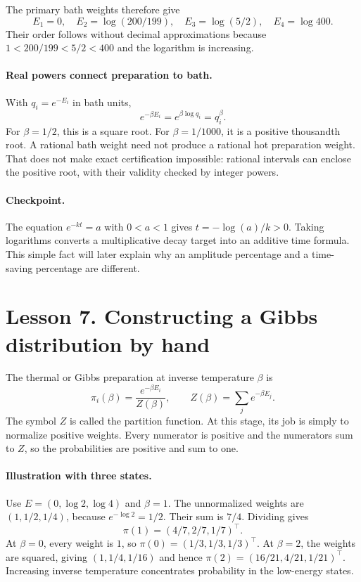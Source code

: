 The primary bath weights therefore give
\[
E_1=0,\quad E_2=\log(200/199),\quad
E_3=\log(5/2),\quad E_4=\log400.
\]
Their order follows without decimal approximations because
$1<200/199<5/2<400$ and the logarithm is increasing.

\paragraph{Real powers connect preparation to bath.}
With $q_i=e^{-E_i}$ in bath units,
\[
e^{-\beta E_i}=e^{\beta\log q_i}=q_i^\beta.
\]
For $\beta=1/2$, this is a square root. For $\beta=1/1000$, it is a positive
thousandth root. A rational bath weight need not produce a rational hot
preparation weight. That does not make exact certification impossible:
rational intervals can enclose the positive root, with their validity checked
by integer powers.

\paragraph{Checkpoint.}
The equation $e^{-kt}=a$ with $0<a<1$ gives
$t=-\log(a)/k>0$. Taking logarithms converts a multiplicative decay target into
an additive time formula. This simple fact will later explain why an amplitude
percentage and a time-saving percentage are different.

\clearpage
\section*{Lesson 7. Constructing a Gibbs distribution by hand}
The thermal or Gibbs preparation at inverse temperature $\beta$ is
\[
\pi_i(\beta)=\frac{e^{-\beta E_i}}{Z(\beta)},
\qquad Z(\beta)=\sum_j e^{-\beta E_j}.
\]
The symbol $Z$ is called the partition function. At this stage, its job is
simply to normalize positive weights. Every numerator is positive and the
numerators sum to $Z$, so the probabilities are positive and sum to one.

\paragraph{Illustration with three states.}
Use $E=(0,\log2,\log4)$ and $\beta=1$. The unnormalized weights are
$(1,1/2,1/4)$, because $e^{-\log2}=1/2$. Their sum is $7/4$. Dividing gives
\[
\pi(1)=(4/7,2/7,1/7)^\top.
\]
At $\beta=0$, every weight is $1$, so $\pi(0)=(1/3,1/3,1/3)^\top$.
At $\beta=2$, the weights are squared, giving $(1,1/4,1/16)$ and hence
$\pi(2)=(16/21,4/21,1/21)^\top$. Increasing inverse temperature concentrates
probability in the low-energy states.

